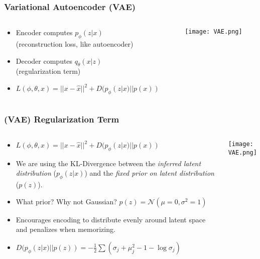 \begin{frame}
    \frametitle{Variational Autoencoder (VAE)}
    \begin{columns}
        \begin{column}{0.60\paperwidth}
            \begin{itemize}
                \item<1-> Encoder computes $p_\phi(z|x)$ \\(reconstruction loss, like
                    autoencoder)
                \item<2-> Decoder computes $q_\theta(x|z)$ \\(regularization term)
                \item<3-> $L(\phi,\theta,x) = ||x - \hat{x}||^2 + D(p_\phi(z|x)
                    || p(x))$
            \end{itemize}
        \end{column}
        \begin{column}{0.40\paperwidth}
            \texttt{[image: VAE.png]}
        \end{column}
    \end{columns}
\end{frame}

\begin{frame}
    \frametitle{(VAE) Regularization Term}
    \begin{columns}
        \begin{column}{0.60\paperwidth}
            \begin{itemize}
                \item<1-> $L(\phi,\theta,x) = ||x - \hat{x}||^2 + D(p_\phi(z|x)
                    || p(x))$
                \item<2-> We are using the KL-Divergence between the
                    \textit{inferred latent distribution} ($p_\phi(z|x)$) and
                    the \textit{fixed prior on latent distribution} ($p(z)$).
                \item<3-> What prior? Why not Gaussian? $p(z) =
                    \mathcal{N}(\mu=0, \sigma^2=1)$
                \item<4-> Encourages encoding to distribute evenly around latent
                    space and penalizes when memorizing.
                \item<4-> $D(p_\phi(z|x) || p(z)) = -\frac12\sum(\sigma_j +
                    \mu_j^2 - 1 -\log{\sigma_j})$
            \end{itemize}
        \end{column}
        \begin{column}{0.40\paperwidth}
            \texttt{[image: VAE.png]}
        \end{column}
    \end{columns}
\end{frame}

